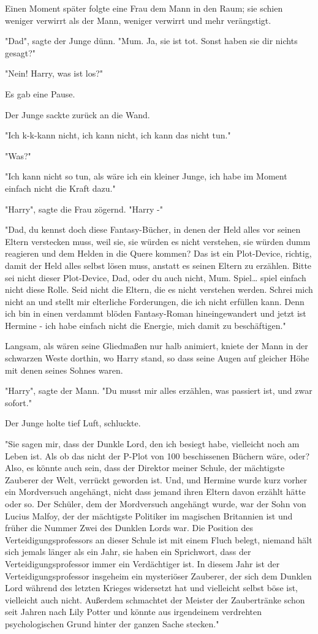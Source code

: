 {Einen Moment später folgte eine Frau dem Mann in den Raum; sie schien weniger verwirrt als der Mann, weniger verwirrt und mehr verängstigt.

"Dad", sagte der Junge dünn. "Mum. Ja, sie ist tot. Sonst haben sie dir nichts gesagt?"

"Nein! Harry, was ist los?"

Es gab eine Pause.

Der Junge sackte zurück an die Wand.

"Ich k-k-kann nicht, ich kann nicht, ich kann das nicht tun."

"Was?"

"Ich kann nicht so tun, als wäre ich ein kleiner Junge, ich habe im Moment einfach nicht die Kraft dazu."

"Harry", sagte die Frau zögernd. "Harry -"

"Dad, du kennst doch diese Fantasy-Bücher, in denen der Held alles vor seinen Eltern verstecken muss, weil sie, sie würden es nicht verstehen, sie würden dumm reagieren und dem Helden in die Quere kommen? Das ist ein Plot-Device, richtig, damit der Held alles selbst lösen muss, anstatt es seinen Eltern zu erzählen. Bitte sei nicht dieser Plot-Device, Dad, oder du auch nicht, Mum. Spiel… spiel einfach nicht diese Rolle. Seid nicht die Eltern, die es nicht verstehen werden. Schrei mich nicht an und stellt mir elterliche Forderungen, die ich nicht erfüllen kann. Denn ich bin in einen verdammt blöden Fantasy-Roman hineingewandert und jetzt ist Hermine - ich habe einfach nicht die Energie, mich damit zu beschäftigen."

Langsam, als wären seine Gliedmaßen nur halb animiert, kniete der Mann in der schwarzen Weste dorthin, wo Harry stand, so dass seine Augen auf gleicher Höhe mit denen seines Sohnes waren.

"Harry", sagte der Mann. "Du musst mir alles erzählen, was passiert ist, und zwar sofort."

Der Junge holte tief Luft, schluckte.

"Sie sagen mir, dass der Dunkle Lord, den ich besiegt habe, vielleicht noch am Leben ist. Als ob das nicht der P-Plot von 100 beschissenen Büchern wäre, oder? Also, es könnte auch sein, dass der Direktor meiner Schule, der mächtigste Zauberer der Welt, verrückt geworden ist. Und, und Hermine wurde kurz vorher ein Mordversuch angehängt, nicht dass jemand ihren Eltern davon erzählt hätte oder so. Der Schüler, dem der Mordversuch angehängt wurde, war der Sohn von Lucius Malfoy, der der mächtigste Politiker im magischen Britannien ist und früher die Nummer Zwei des Dunklen Lords war. Die Position des Verteidigungsprofessors an dieser Schule ist mit einem Fluch belegt, niemand hält sich jemals länger als ein Jahr, sie haben ein Sprichwort, dass der Verteidigungsprofessor immer ein Verdächtiger ist. In diesem Jahr ist der Verteidigungsprofessor insgeheim ein mysteriöser Zauberer, der sich dem Dunklen Lord während des letzten Krieges widersetzt hat und vielleicht selbst böse ist, vielleicht auch nicht. Außerdem schmachtet der Meister der Zaubertränke schon seit Jahren nach Lily Potter und könnte aus irgendeinem verdrehten psychologischen Grund hinter der ganzen Sache stecken."

}
